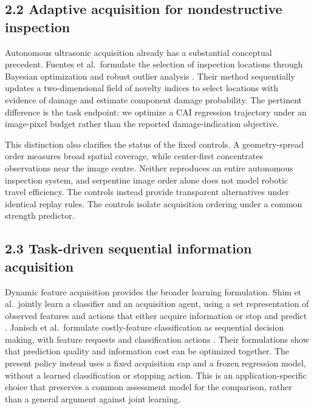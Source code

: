 \hypertarget{adaptive-acquisition-for-nondestructive-inspection}{%
\subsection{2.2 Adaptive acquisition for nondestructive inspection}\label{adaptive-acquisition-for-nondestructive-inspection}}

Autonomous ultrasonic acquisition already has a substantial conceptual precedent. Fuentes et al.~formulate the selection of inspection locations through Bayesian optimization and robust outlier analysis \citep{fuentes2020}. Their method sequentially updates a two-dimensional field of novelty indices to select locations with evidence of damage and estimate component damage probability. The pertinent difference is the task endpoint: we optimize a CAI regression trajectory under an image-pixel budget rather than the reported damage-indication objective.

This distinction also clarifies the status of the fixed controls. A geometry-spread order measures broad spatial coverage, while center-first concentrates observations near the image centre. Neither reproduces an entire autonomous inspection system, and serpentine image order alone does not model robotic travel efficiency. The controls instead provide transparent alternatives under identical replay rules. The controls isolate acquisition ordering under a common strength predictor.

\hypertarget{task-driven-sequential-information-acquisition}{%
\subsection{2.3 Task-driven sequential information acquisition}\label{task-driven-sequential-information-acquisition}}

Dynamic feature acquisition provides the broader learning formulation. Shim et al.~jointly learn a classifier and an acquisition agent, using a set representation of observed features and actions that either acquire information or stop and predict \citep{shim2018}. Janisch et al.~formulate costly-feature classification as sequential decision making, with feature requests and classification actions \citep{janisch2019}. Their formulations show that prediction quality and information cost can be optimized together. The present policy instead uses a fixed acquisition cap and a frozen regression model, without a learned classification or stopping action. This is an application-specific choice that preserves a common assessment model for the comparison, rather than a general argument against joint learning.

